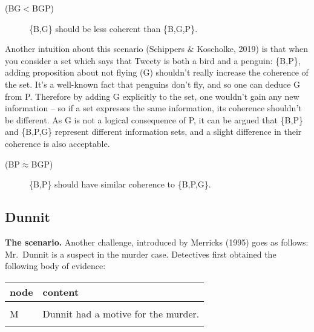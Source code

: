 \documentclass[10pt,]{scrartcl}
\newcommand{\s}[1]{\mbox{\textsf{#1}}}
\begin{document}
\vspace{2mm}

\begin{description}
    \item[(\s{BG}$<$\s{BGP})] \{\s{B},\s{G}\}  should be less coherent than \{\s{B},\s{G},\s{P}\}. 
\end{description}

\vspace{2mm}

Another intuition about this scenario (Schippers \& Koscholke, 2019) is
that when you consider a set which says that Tweety is both a bird and a
penguin: \{\s{B},\s{P}\}, adding proposition about not flying (\s{G})
shouldn't really increase the coherence of the set. It's a well-known
fact that penguins don't fly, and so one can deduce \s{G} from \s{P}.
Therefore by adding \s{G} explicitly to the set, one wouldn't gain any
new information -- so if a set expresses the same information, its
coherence shouldn't be different. As \s{G} is not a logical consequence
of \s{P}, it can be argued that \{\s{B},\s{P}\} and
\{\s{B},\s{P},\s{G}\} represent different information sets, and a slight
difference in their coherence is also acceptable.

\vspace{2mm}

\begin{description}
    \item[(\s{BP}$\approx$\s{BGP})]  \{\s{B},\s{P}\} should have similar coherence to \{\s{B},\s{P},\s{G}\}.  
\end{description}

\vspace{2mm}

\subsection{Dunnit}

\textbf{The scenario.} Another challenge, introduced by Merricks (1995)
goes as follows: Mr.~Dunnit is a suspect in the murder case. Detectives
first obtained the following body of evidence:

\begin{table}[H]
\centering
\begin{tabular}{l>{\raggedright\arraybackslash}p{25em}}
\toprule
node & content\\
\midrule
\cellcolor{gray!6}{I} & \cellcolor{gray!6}{Witnesses claim to have seen Dunnit do it (incriminating testimony).}\\
M & Dunnit had a motive for the murder.\\
\cellcolor{gray!6}{W} & \cellcolor{gray!6}{A credible witness claims to have seen Dunnit two hundred miles from the scene of the crime at the time of the murder.}\\
\bottomrule
\end{tabular}
\end{table}
\end{document}
